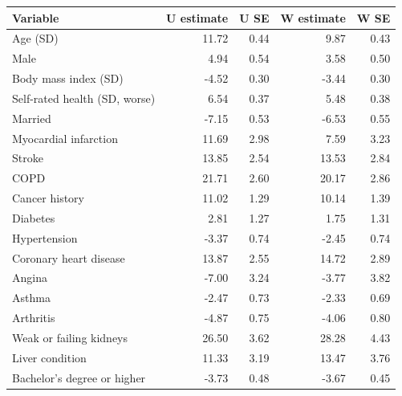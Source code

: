 \begin{tabular}{lrrrr}
\toprule
Variable & U estimate & U SE & W estimate & W SE\\
\midrule
Age (SD) & 11.72 & 0.44 & 9.87 & 0.43\\
Male & 4.94 & 0.54 & 3.58 & 0.50\\
Body mass index (SD) & -4.52 & 0.30 & -3.44 & 0.30\\
Self-rated health (SD, worse) & 6.54 & 0.37 & 5.48 & 0.38\\
Married & -7.15 & 0.53 & -6.53 & 0.55\\
Myocardial infarction & 11.69 & 2.98 & 7.59 & 3.23\\
Stroke & 13.85 & 2.54 & 13.53 & 2.84\\
COPD & 21.71 & 2.60 & 20.17 & 2.86\\
Cancer history & 11.02 & 1.29 & 10.14 & 1.39\\
Diabetes & 2.81 & 1.27 & 1.75 & 1.31\\
Hypertension & -3.37 & 0.74 & -2.45 & 0.74\\
Coronary heart disease & 13.87 & 2.55 & 14.72 & 2.89\\
Angina & -7.00 & 3.24 & -3.77 & 3.82\\
Asthma & -2.47 & 0.73 & -2.33 & 0.69\\
Arthritis & -4.87 & 0.75 & -4.06 & 0.80\\
Weak or failing kidneys & 26.50 & 3.62 & 28.28 & 4.43\\
Liver condition & 11.33 & 3.19 & 13.47 & 3.76\\
Bachelor's degree or higher & -3.73 & 0.48 & -3.67 & 0.45\\
\bottomrule
\end{tabular}
